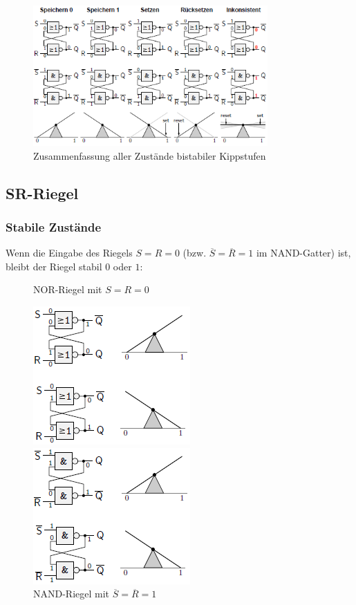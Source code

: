 \documentclass[12pt]{report}
\begin{document}
\begin{figure}[H]
  \caption{Zusammenfassung aller Zustände bistabiler Kippstufen}
  \centering
  \includegraphics[width=0.8\textwidth]{../graphics/riegel_zusammenfassung.png}
\end{figure}

\subsection{SR-Riegel}

\subsubsection{Stabile Zustände}
Wenn die Eingabe des Riegels $S=R=0$ (bzw. $\overline{S}=\overline{R}=1$ im NAND-Gatter) ist, bleibt der Riegel stabil $0$ oder $1$:

\begin{figure}[H]
  \begin{minipage}[t]{0.48\textwidth}
    \caption{NOR-Riegel mit $S=R=0$}
    \centering
    \includegraphics{riegel_nor_stabil}
  \end{minipage}
  \hfill
  \begin{minipage}[t]{0.48\textwidth}
    \caption{NAND-Riegel mit $\overline{S}=\overline{R}=1$}
    \centering
    \includegraphics{riegel_nand_stabil}
  \end{minipage}
\end{figure}
\end{document}
